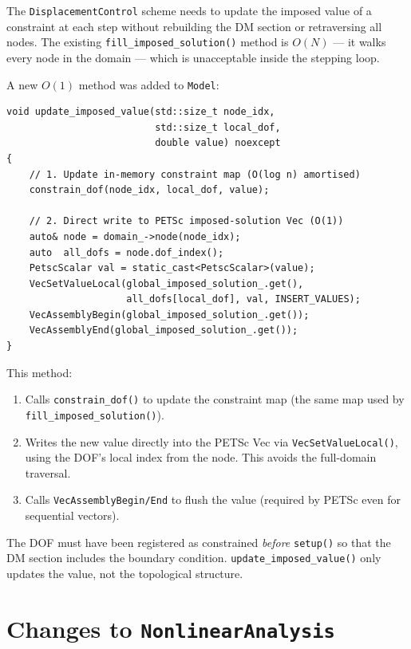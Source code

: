 The \texttt{DisplacementControl} scheme needs to update the imposed value
of a constraint at each step without rebuilding the DM section or
retraversing all nodes.  The existing \texttt{fill\_imposed\_solution()}
method is $O(N)$ --- it walks every node in the domain --- which is
unacceptable inside the stepping loop.

A new $O(1)$ method was added to \texttt{Model}:

\begin{lstlisting}
void update_imposed_value(std::size_t node_idx,
                          std::size_t local_dof,
                          double value) noexcept
{
    // 1. Update in-memory constraint map (O(log n) amortised)
    constrain_dof(node_idx, local_dof, value);

    // 2. Direct write to PETSc imposed-solution Vec (O(1))
    auto& node = domain_->node(node_idx);
    auto  all_dofs = node.dof_index();
    PetscScalar val = static_cast<PetscScalar>(value);
    VecSetValueLocal(global_imposed_solution_.get(),
                     all_dofs[local_dof], val, INSERT_VALUES);
    VecAssemblyBegin(global_imposed_solution_.get());
    VecAssemblyEnd(global_imposed_solution_.get());
}
\end{lstlisting}

This method:
\begin{enumerate}
  \item Calls \texttt{constrain\_dof()} to update the constraint map
        (the same map used by \texttt{fill\_imposed\_solution()}).
  \item Writes the new value directly into the PETSc Vec via
        \texttt{VecSetValueLocal()}, using the DOF's local index
        from the node. This avoids the full-domain traversal.
  \item Calls \texttt{VecAssemblyBegin/End} to flush the value
        (required by PETSc even for sequential vectors).
\end{enumerate}

\begin{remark}
The DOF must have been registered as constrained \emph{before}
\texttt{setup()} so that the DM section includes the boundary
condition.  \texttt{update\_imposed\_value()} only updates the value,
not the topological structure.
\end{remark}

\section{Changes to \texttt{NonlinearAnalysis}}
\label{sec:ic-nlanalysis}

